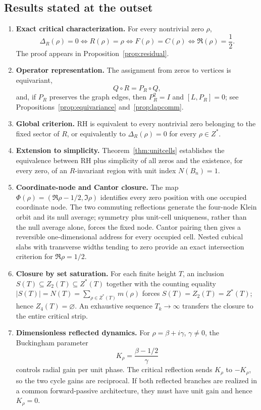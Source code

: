 \documentclass[11pt]{amsart}
\theoremstyle{definition}
\theoremstyle{remark}
\begin{document}
\subsection{Results stated at the outset}
\begin{enumerate}[label=\textbf{R\arabic*.},leftmargin=*]
\item \textbf{Exact critical characterization.} For every nontrivial zero $\rho$,
\[
\Delta_R(\rho)=0\iff R(\rho)=\rho\iff F(\rho)=C(\rho)\iff \Re(\rho)=\frac12.
\]
The proof appears in Proposition~\ref{prop:residual}.
\item \textbf{Operator representation.} The assignment from zeros to vertices is equivariant,
\[
Q\circ R=P_R\circ Q,
\]
and, if $P_R$ preserves the graph edges, then $P_R^2=I$ and $[L,P_R]=0$; see Propositions~\ref{prop:equivariance} and~\ref{prop:lapcomm}.
\item \textbf{Global criterion.} RH is equivalent to every nontrivial zero belonging to the fixed sector of $R$, or equivalently to $\Delta_R(\rho)=0$ for every $\rho\in Z^*$.
\item \textbf{Extension to simplicity.} Theorem~\ref{thm:unitcells} establishes the equivalence between RH plus simplicity of all zeros and the existence, for every zero, of an $R$-invariant region with unit index $N(B_n)=1$.
\item \textbf{Coordinate-node and Cantor closure.}  The map
$\Phi(\rho)=(\Re\rho-1/2,\Im\rho)$ identifies every zero position with one occupied
coordinate node.  The two commuting reflections generate the four-node Klein orbit and its
null average; symmetry plus unit-cell uniqueness, rather than the null average alone, forces
the fixed node.  Cantor pairing then gives a reversible one-dimensional address for every
occupied cell.  Nested cubical slabs with transverse widths tending to zero provide an exact
intersection criterion for $\Re\rho=1/2$.
\item \textbf{Closure by set saturation.} For each finite height $T$, an inclusion $S(T)\subseteq Z_2(T)\subseteq Z^*(T)$ together with the counting equality $|S(T)|=N(T)=\sum_{\rho\in Z^*(T)}m(\rho)$ forces $S(T)=Z_2(T)=Z^*(T)$; hence $Z_4(T)=\varnothing$. An exhaustive sequence $T_k\to\infty$ transfers the closure to the entire critical strip.
\item \textbf{Dimensionless reflected dynamics.} For $\rho=\beta+i\gamma$, $\gamma\ne0$, the Buckingham parameter
\[
K_\rho=\frac{\beta-1/2}{\gamma}
\]
controls radial gain per unit phase.  The critical reflection sends $K_\rho$ to $-K_\rho$, so the two cycle gains are reciprocal.  If both reflected branches are realized in a common forward-passive architecture, they must have unit gain and hence $K_\rho=0$.

\end{enumerate}
\end{document}
